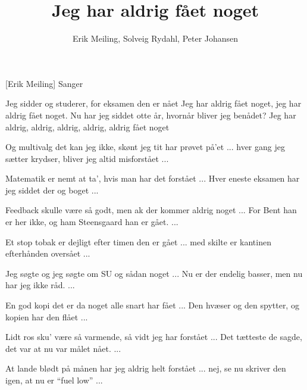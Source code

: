 \documentclass[a4paper,11pt]{article}
\title{Jeg har aldrig fået noget}
\author{Erik Meiling, Solveig Rydahl, Peter Johansen}
\begin{document}
\maketitle

\begin{roles}
[Erik Meiling] Sanger
\end{roles}

\begin{song}
Jeg sidder og studerer, for eksamen den er nået
\hspace{1cm} Jeg har aldrig fået noget, jeg har aldrig fået noget.
Nu har jeg siddet otte år, hvornår bliver jeg benådet?
\hspace{1cm} Jeg har aldrig, aldrig, aldrig, aldrig, aldrig fået noget

Og multivalg det kan jeg ikke, skønt jeg tit har prøvet på'et
\hspace{1cm} ...
hver gang jeg sætter krydser, bliver jeg altid misforstået
\hspace{1cm} ...

Matematik er nemt at ta', hvis man har det forstået
\hspace{1cm} ...
Hver eneste eksamen har jeg siddet der og boget
\hspace{1cm} ...

Feedback skulle være så godt, men ak der kommer aldrig noget
\hspace{1cm} ...
For Bent han er her ikke, og ham Steensgaard han er gået.
\hspace{1cm} ...

Et stop tobak er dejligt efter timen den er gået
\hspace{1cm} ...
med skilte er kantinen efterhånden oversået
\hspace{1cm} ...

Jeg søgte og jeg søgte om SU og sådan noget
\hspace{1cm} ...
Nu er der endelig basser, men nu har jeg ikke råd.
\hspace{1cm} ...

En god kopi det er da noget alle snart har fået
\hspace{1cm} ...
Den hvæser og den spytter, og kopien har den flået
\hspace{1cm} ...

Lidt ros sku' være så varmende, så vidt jeg har forstået
\hspace{1cm} ...
Det tætteste de sagde, det var at nu var målet nået.
\hspace{1cm} ...

At lande blødt på månen har jeg aldrig helt forstået
\hspace{1cm} ...
nej, se nu skriver den igen, at nu er "`fuel low"'
\hspace{1cm} ...
\end{song}
\end{document}
